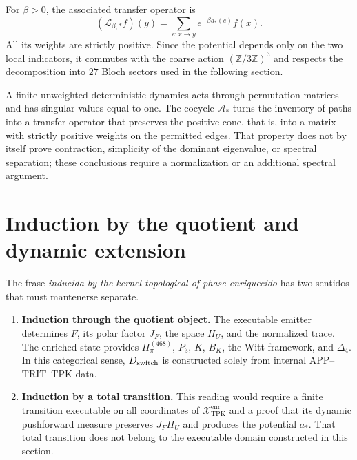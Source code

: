 For \(\beta>0\), the associated transfer operator is
\[
 (\mathcal L_{\beta,*}f)(y)
 =\sum_{e:x\to y}e^{-\beta a_*(e)}f(x).
\]
All its weights are strictly positive. Since the potential depends only
on the two local indicators, it commutes with the coarse action
\((\mathbb Z/3\mathbb Z)^3\) and respects the decomposition into \(27\)
Bloch sectors used in the following section.

A finite unweighted deterministic dynamics acts through permutation matrices and has singular values equal to one. The cocycle \(\mathcal A_*\) turns the inventory of paths into a transfer operator that preserves the positive cone, that is, into a matrix with strictly positive weights on the permitted edges. That property does not by itself prove contraction, simplicity of the dominant eigenvalue, or spectral separation; these conclusions require a normalization or an additional spectral argument.

\ifdefined\HMTInternalTraceability
\section{Induction by the quotient and dynamic extension}

The frase \emph{inducida by the kernel topological of phase enriquecido} has two sentidos that must mantenerse
separate.

\begin{enumerate}
  \item \textbf{Induction through the quotient object.} The executable emitter
  determines \(F\), its polar factor \(J_F\), the space \(H_U\), and the
  normalized trace. The enriched state provides
  \(\Pi_\pi^{(468)}\), \(P_3\),
  \(K\), \(B_K\), the Witt framework, and \(\Delta_4\). In this
  categorical sense, \(D_{\rm switch}\) is constructed solely from internal
  APP--TRIT--TPK data\@.
  \item \textbf{Induction by a total transition.} This reading would require
  a finite transition executable on all coordinates of
  \(\mathcal X_{\mathrm{TPK}}^{\mathrm{enr}}\) and a proof that its dynamic
  pushforward measure
  preserves \(J_FH_U\) and produces the potential \(a_*\). That total transition
  does not belong to the executable domain constructed in this section.
\end{enumerate}

